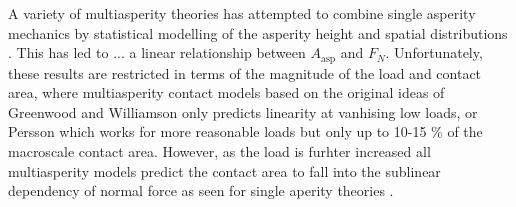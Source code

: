 A variety of multiasperity theories has attempted to combine single asperity mechanics by statistical modelling of the asperity height and spatial distributions \cite{CARBONE20082555}. This has led to ... a linear relationship between $A_{\text{asp}}$ and $F_N$. Unfortunately, these results are restricted in terms of the magnitude of the load and contact area, where multiasperity contact models based on the original ideas of Greenwood and Williamson \cite{GW} only predicts linearity at vanhising low loads, or Persson \cite{Persson} which works for more reasonable loads but only up to 10-15 \% of the macroscale contact area. However, as the load is furhter increased all multiasperity models predict the contact area to fall into the sublinear dependency of normal force as seen for single aperity theories \cite{CARBONE20082555}.

















